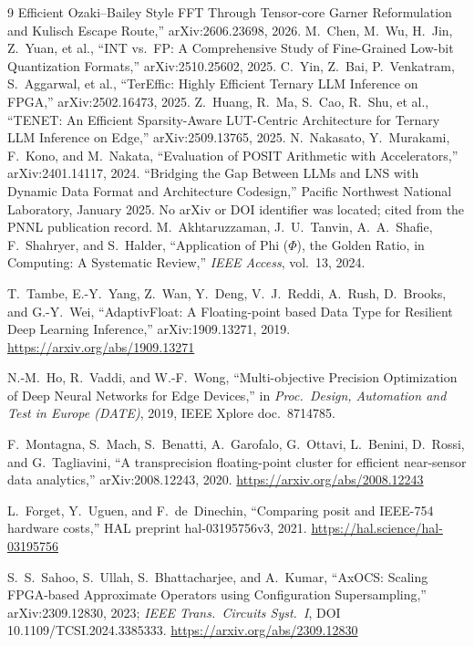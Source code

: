 \documentclass[11pt]{article}
\theoremstyle{definition}
\begin{document}
\begin{thebibliography}{9}
Efficient Ozaki--Bailey Style FFT Through Tensor-core Garner Reformulation and
Kulisch Escape Route,'' arXiv:2606.23698, 2026.
 M.~Chen, M.~Wu, H.~Jin, Z.~Yuan, et al., ``INT vs.\ FP:
A Comprehensive Study of Fine-Grained Low-bit Quantization Formats,''
arXiv:2510.25602, 2025.
 C.~Yin, Z.~Bai, P.~Venkatram, S.~Aggarwal, et al.,
``TerEffic: Highly Efficient Ternary LLM Inference on FPGA,'' arXiv:2502.16473,
2025.
 Z.~Huang, R.~Ma, S.~Cao, R.~Shu, et al., ``TENET: An
Efficient Sparsity-Aware LUT-Centric Architecture for Ternary LLM Inference on
Edge,'' arXiv:2509.13765, 2025.
 N.~Nakasato, Y.~Murakami, F.~Kono, and M.~Nakata,
``Evaluation of POSIT Arithmetic with Accelerators,'' arXiv:2401.14117, 2024.
 ``Bridging the Gap Between LLMs and LNS with Dynamic Data
Format and Architecture Codesign,'' Pacific Northwest National Laboratory,
January 2025. No arXiv or DOI identifier was located; cited from the PNNL
publication record.
 M.~Akhtaruzzaman, J.~U.~Tanvin, A.~A.~Shafie,
F.~Shahryer, and S.~Halder, ``Application of Phi ($\Phi$), the Golden Ratio, in
Computing: A Systematic Review,'' \emph{IEEE Access}, vol.~13, 2024.

 T.~Tambe, E.-Y.~Yang, Z.~Wan, Y.~Deng, V.~J.~Reddi, A.~Rush, D.~Brooks, and G.-Y.~Wei, ``AdaptivFloat: A Floating-point based Data Type for Resilient Deep Learning Inference,'' arXiv:1909.13271, 2019. \url{https://arxiv.org/abs/1909.13271}

 N.-M.~Ho, R.~Vaddi, and W.-F.~Wong, ``Multi-objective Precision Optimization of Deep Neural Networks for Edge Devices,'' in \emph{Proc.\ Design, Automation and Test in Europe (DATE)}, 2019, IEEE Xplore doc.\ 8714785.

 F.~Montagna, S.~Mach, S.~Benatti, A.~Garofalo, G.~Ottavi, L.~Benini, D.~Rossi, and G.~Tagliavini, ``A transprecision floating-point cluster for efficient near-sensor data analytics,'' arXiv:2008.12243, 2020. \url{https://arxiv.org/abs/2008.12243}

 L.~Forget, Y.~Uguen, and F.~de~Dinechin, ``Comparing posit and IEEE-754 hardware costs,'' HAL preprint hal-03195756v3, 2021. \url{https://hal.science/hal-03195756}

 S.~S.~Sahoo, S.~Ullah, S.~Bhattacharjee, and A.~Kumar, ``AxOCS: Scaling FPGA-based Approximate Operators using Configuration Supersampling,'' arXiv:2309.12830, 2023; \emph{IEEE Trans.\ Circuits Syst.\ I}, DOI 10.1109/TCSI.2024.3385333. \url{https://arxiv.org/abs/2309.12830}


\end{thebibliography}
\end{document}

